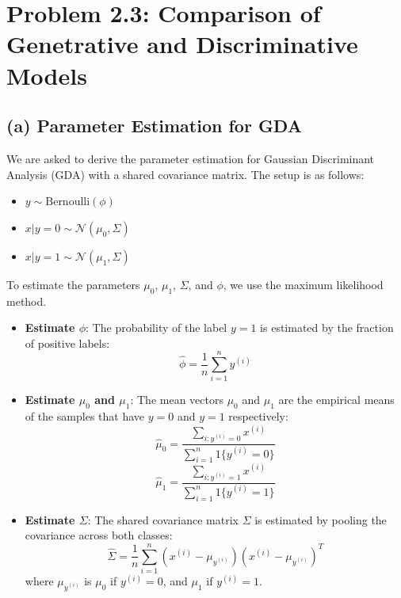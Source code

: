 \documentclass[12pt]{article}
\begin{document}
\newpage

\section*{Problem 2.3: Comparison of Genetrative and Discriminative Models}

\subsection*{(a) Parameter Estimation for GDA}

We are asked to derive the parameter estimation for Gaussian Discriminant Analysis (GDA) with a shared covariance matrix. The setup is as follows:

\begin{itemize}
    \item $ y \sim \text{Bernoulli}(\phi) $
    \item $ x | y = 0 \sim \mathcal{N}(\mu_0, \Sigma) $
    \item $ x | y = 1 \sim \mathcal{N}(\mu_1, \Sigma) $
\end{itemize}

To estimate the parameters $\mu_0$, $\mu_1$, $\Sigma$, and $\phi$, we use the maximum likelihood method.

\begin{itemize}
    \item \textbf{Estimate $\phi$}: The probability of the label $y = 1$ is estimated by the fraction of positive labels:
    \[
    \hat{\phi} = \frac{1}{n} \sum_{i=1}^n y^{(i)}
    \]

    \item \textbf{Estimate $\mu_0$ and $\mu_1$}: The mean vectors $\mu_0$ and $\mu_1$ are the empirical means of the samples that have $y = 0$ and $y = 1$ respectively:
    \[
    \hat{\mu}_0 = \frac{\sum_{i: y^{(i)} = 0} x^{(i)}}{\sum_{i=1}^n 1\{y^{(i)} = 0\}}
    \]
    \[
    \hat{\mu}_1 = \frac{\sum_{i: y^{(i)} = 1} x^{(i)}}{\sum_{i=1}^n 1\{y^{(i)} = 1\}}
    \]
    
    \item \textbf{Estimate $\Sigma$}: The shared covariance matrix $\Sigma$ is estimated by pooling the covariance across both classes:
    \[
    \hat{\Sigma} = \frac{1}{n} \sum_{i=1}^n \left( x^{(i)} - \mu_{y^{(i)}} \right)\left( x^{(i)} - \mu_{y^{(i)}} \right)^T
    \]
    where $\mu_{y^{(i)}}$ is $\mu_0$ if $y^{(i)} = 0$, and $\mu_1$ if $y^{(i)} = 1$.
\end{itemize}
\end{document}
